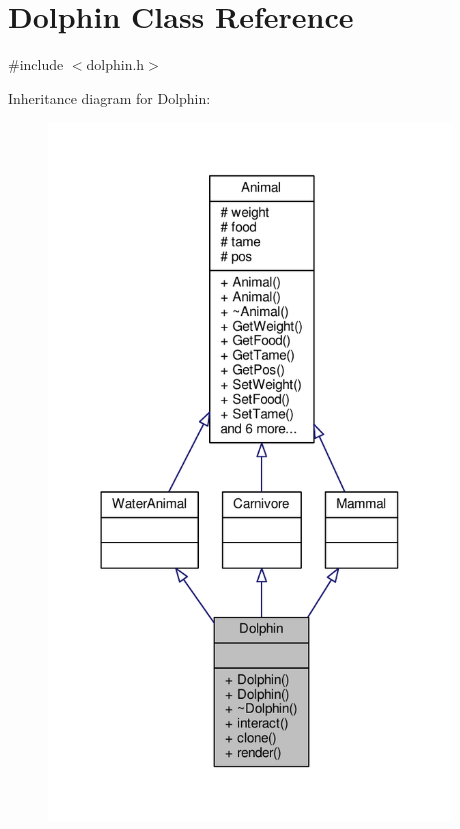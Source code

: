 \hypertarget{classDolphin}{}\section{Dolphin Class Reference}
\label{classDolphin}


{\ttfamily \#include $<$dolphin.\+h$>$}



Inheritance diagram for Dolphin\+:
\nopagebreak
\begin{figure}[H]
\begin{center}
\leavevmode
\includegraphics[width=303pt]{classDolphin__inherit__graph}
\end{center}
\end{figure}


